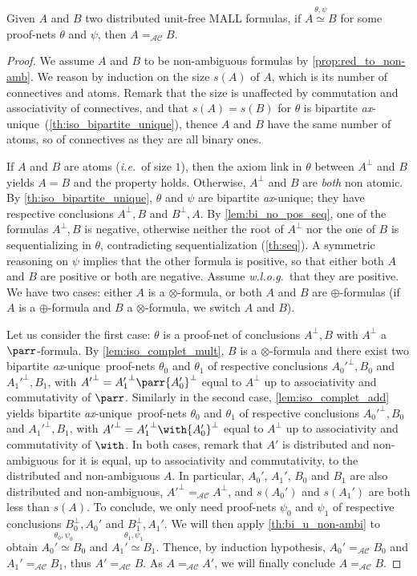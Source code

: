 \documentclass{lmcs}
\newcommand*{\orth}{^\perp} %
\newcommand*{\tens}{\otimes} %
\newcommand*{\ie}{\emph{i.e.}}
\newcommand*{\wolog}{\emph{w.l.o.g.}}
\newcommand*{\iso}{\mathrel{\simeq}} %
\newcommand*{\AC}{\mathcal{AC}} %
\newcommand*{\eqeq}{=} %
\newcommand*{\eqAC}{\eqeq_\AC} %
\newcommand{\isoproofs}[4]{\overset{\ensuremath{#3,#4}}{#1\iso #2}}
\newcommand*{\unique}{\textit{ax}-unique}
\begin{document}
\begin{thm}
\label{th:iso_complet}
Given $A$ and $B$ two distributed unit-free MALL formulas, if $\isoproofs{A}{B}{\theta}{\psi}$ for some proof-nets $\theta$ and $\psi$, then $A\eqAC B$.
\end{thm}
\begin{proof}
We assume $A$ and $B$ to be non-ambiguous formulas by \autoref{prop:red_to_non-amb}.
We reason by induction on the size $s(A)$ of $A$, which is its number of connectives and atoms.
Remark that the size is unaffected by commutation and associativity of connectives, and that $s(A)=s(B)$ for $\theta$ is bipartite \unique\ (\autoref{th:iso_bipartite_unique}), thence $A$ and $B$ have the same number of atoms, so of connectives as they are all binary ones.

If $A$ and $B$ are atoms (\ie\ of size $1$), then the axiom link in $\theta$ between $A\orth$ and $B$ yields $A=B$ and the property holds.
Otherwise, $A\orth$ and $B$ are \emph{both} non atomic.
By \autoref{th:iso_bipartite_unique}, $\theta$ and $\psi$ are bipartite \unique; they have respective conclusions $A\orth, B$ and $B\orth,A$.
By \autoref{lem:bi_no_pos_seq}, one of the formulas $A\orth,B$ is negative, otherwise neither the root of $A\orth$ nor the one of $B$ is sequentializing in $\theta$, contradicting sequentialization (\autoref{th:seq}).
A symmetric reasoning on $\psi$ implies that the other formula is positive, so that either both $A$ and $B$ are positive or both are negative.
Assume \wolog\ that they are positive.
We have two cases: either $A$ is a $\tens$-formula, or both $A$ and $B$ are $\oplus$-formulas (if $A$ is a $\oplus$-formula and $B$ a $\tens$-formula, we switch $A$ and $B$).

Let us consider the first case: $\theta$ is a proof-net of conclusions $A\orth,B$ with $A\orth$ a $\parr$-formula.
By \autoref{lem:iso_complet_mult}, $B$ is a $\tens$-formula and there exist two bipartite \unique\ proof-nets $\theta_0$ and $\theta_1$ of respective conclusions ${A_0'}\orth,B_0$ and ${A_1'}\orth,B_1$, with ${A'}\orth={A_1'}\orth\parr{A_0'}\orth$ equal to $A\orth$ up to associativity and commutativity of $\parr$.
Similarly in the second case, \autoref{lem:iso_complet_add} yields bipartite \unique\ proof-nets $\theta_0$ and $\theta_1$ of respective conclusions ${A_0'}\orth,B_0$ and ${A_1'}\orth,B_1$, with ${A'}\orth={A_1'}\orth\with{A_0'}\orth$ equal to $A\orth$ up to associativity and commutativity of $\with$.
In both cases, remark that $A'$ is distributed and non-ambiguous for it is equal, up to associativity and commutativity, to the distributed and non-ambiguous $A$.
In particular, $A_0'$, $A_1'$, $B_0$ and $B_1$ are also distributed and non-ambiguous, ${A'}\orth\eqAC A\orth$, and $s(A_0')$ and $s(A_1')$ are both less than $s(A)$.
To conclude, we only need proof-nets $\psi_0$ and $\psi_1$ of respective conclusions $B_0\orth,A_0'$ and $B_1\orth,A_1'$.
We will then apply \autoref{th:bi_u_non-ambi} to obtain $\isoproofs{A_0'}{B_0}{\theta_0}{\psi_0}$ and $\isoproofs{A_1'}{B_1}{\theta_1}{\psi_1}$.
Thence, by induction hypothesis, $A_0'\eqAC B_0$ and $A_1'\eqAC B_1$, thus $A'\eqAC B$.
As $A\eqAC A'$, we will finally conclude $A\eqAC B$.


\end{proof}
\end{document}
